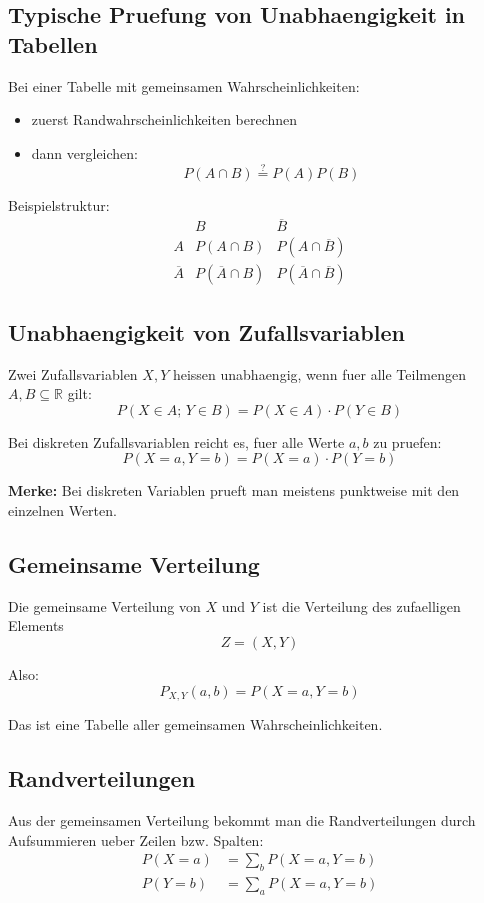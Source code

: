 \documentclass[a4paper,11pt]{article}
\begin{document}
\subsection{Typische Pruefung von Unabhaengigkeit in Tabellen}
Bei einer Tabelle mit gemeinsamen Wahrscheinlichkeiten:
\begin{itemize}
  \item zuerst Randwahrscheinlichkeiten berechnen
  \item dann vergleichen:
  \[
  P(A \cap B)\stackrel{?}{=}P(A)P(B)
  \]
\end{itemize}

Beispielstruktur:
\[
\begin{array}{c|cc}
 & B & \overline{B} \\
\hline
A & P(A \cap B) & P(A \cap \overline{B}) \\
\overline{A} & P(\overline{A} \cap B) & P(\overline{A} \cap \overline{B})
\end{array}
\]

\subsection{Unabhaengigkeit von Zufallsvariablen}
Zwei Zufallsvariablen $X,Y$ heissen unabhaengig, wenn fuer alle Teilmengen $A,B \subseteq \mathbb{R}$ gilt:
\[
P(X \in A;\, Y \in B)=P(X \in A)\cdot P(Y \in B)
\]

Bei diskreten Zufallsvariablen reicht es, fuer alle Werte $a,b$ zu pruefen:
\[
P(X=a, Y=b)=P(X=a)\cdot P(Y=b)
\]

\textbf{Merke:}
Bei diskreten Variablen prueft man meistens punktweise mit den einzelnen Werten.

\subsection{Gemeinsame Verteilung}
Die gemeinsame Verteilung von $X$ und $Y$ ist die Verteilung des zufaelligen Elements
\[
Z=(X,Y)
\]

Also:
\[
P_{X,Y}(a,b)=P(X=a,Y=b)
\]

Das ist eine Tabelle aller gemeinsamen Wahrscheinlichkeiten.

\subsection{Randverteilungen}
Aus der gemeinsamen Verteilung bekommt man die Randverteilungen durch Aufsummieren ueber Zeilen bzw. Spalten:
\begin{align*}
P(X=a) &= \sum_b P(X=a,Y=b) \\
P(Y=b) &= \sum_a P(X=a,Y=b)
\end{align*}
\end{document}
